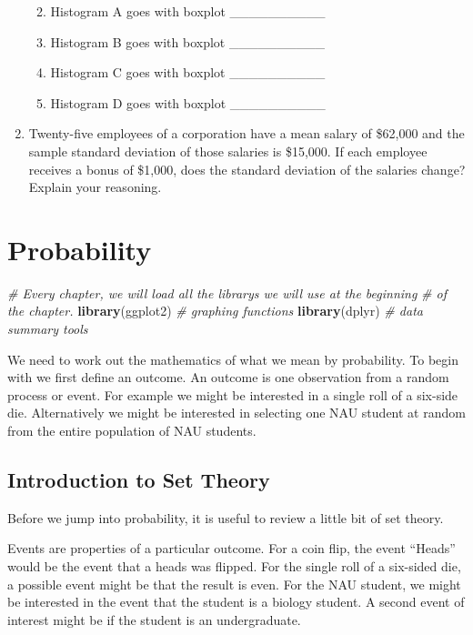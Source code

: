 \documentclass[]{book}
\newenvironment{Shaded}{\begin{snugshade}}{\end{snugshade}}
\newcommand{\KeywordTok}[1]{\textcolor[rgb]{0.13,0.29,0.53}{\textbf{{#1}}}}
\newcommand{\CommentTok}[1]{\textcolor[rgb]{0.56,0.35,0.01}{\textit{{#1}}}}
\newcommand{\NormalTok}[1]{{#1}}
\providecommand{\tightlist}{%
  \setlength{\itemsep}{0pt}\setlength{\parskip}{0pt}}
\begin{document}
\begin{enumerate}
  \begin{enumerate}
  \def\labelenumii{\alph{enumii})}
  \tightlist
  \item
    Histogram A goes with boxplot \_\_\_\_\_\_\_\_\_\_
  \item
    Histogram B goes with boxplot \_\_\_\_\_\_\_\_\_\_
  \item
    Histogram C goes with boxplot \_\_\_\_\_\_\_\_\_\_
  \item
    Histogram D goes with boxplot \_\_\_\_\_\_\_\_\_\_
  \end{enumerate}
\item
  Twenty-five employees of a corporation have a mean salary of \$62,000
  and the sample standard deviation of those salaries is \$15,000. If
  each employee receives a bonus of \$1,000, does the standard deviation
  of the salaries change? Explain your reasoning.
\end{enumerate}

\chapter{Probability}\label{probability}

\begin{Shaded}
\begin{Highlighting}[]
\CommentTok{# Every chapter, we will load all the librarys we will use at the beginning}
\CommentTok{# of the chapter. }
\KeywordTok{library}\NormalTok{(ggplot2)    }\CommentTok{# graphing functions}
\KeywordTok{library}\NormalTok{(dplyr)      }\CommentTok{# data summary tools}
\end{Highlighting}
\end{Shaded}

We need to work out the mathematics of what we mean by probability. To
begin with we first define an outcome. An outcome is one observation
from a random process or event. For example we might be interested in a
single roll of a six-side die. Alternatively we might be interested in
selecting one NAU student at random from the entire population of NAU
students.

\section{Introduction to Set Theory}\label{introduction-to-set-theory}

Before we jump into probability, it is useful to review a little bit of
set theory.

Events are properties of a particular outcome. For a coin flip, the
event ``Heads'' would be the event that a heads was flipped. For the
single roll of a six-sided die, a possible event might be that the
result is even. For the NAU student, we might be interested in the event
that the student is a biology student. A second event of interest might
be if the student is an undergraduate.
\end{document}

